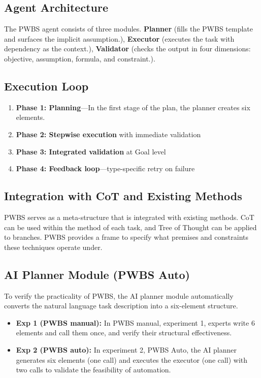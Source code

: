 \documentclass[11pt,a4paper]{article}
\begin{document}
\subsection{Agent Architecture}

The PWBS agent consists of three modules. \textbf{Planner} (fills the PWBS template and surfaces the implicit assumption.), \textbf{Executor} (executes the task with dependency as the context.), \textbf{Validator} (checks the output in four dimensions: objective, assumption, formula, and constraint.).

\subsection{Execution Loop}

\begin{enumerate}[leftmargin=2em]
  \item \textbf{Phase 1: Planning}---In the first stage of the plan, the planner creates six elements.
  \item \textbf{Phase 2: Stepwise execution} with immediate validation
  \item \textbf{Phase 3: Integrated validation} at Goal level
  \item \textbf{Phase 4: Feedback loop}---type-specific retry on failure
\end{enumerate}

\subsection{Integration with CoT and Existing Methods}

PWBS serves as a meta-structure that is integrated with existing methods. CoT can be used within the method of each task, and Tree of Thought can be applied to branches. PWBS provides a frame to specify what premises and constraints these techniques operate under.

\subsection{AI Planner Module (PWBS Auto)}

To verify the practicality of PWBS, the AI planner module automatically converts the natural language task description into a six-element structure.

\begin{itemize}[leftmargin=2em]
  \item \textbf{Exp 1 (PWBS manual):} In PWBS manual, experiment 1, experts write 6 elements and call them once, and verify their structural effectiveness.
  \item \textbf{Exp 2 (PWBS auto):} In experiment 2, PWBS Auto, the AI planner generates six elements (one call) and executes the executor (one call) with two calls to validate the feasibility of automation.
\end{itemize}
\end{document}
